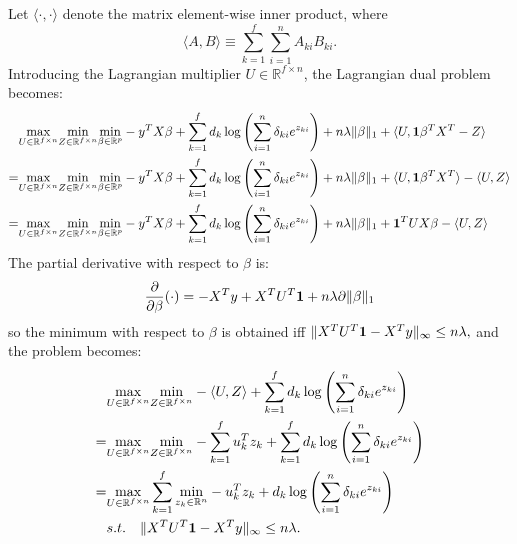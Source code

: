 Let $\langle\cdot,\cdot\rangle$ denote the matrix element-wise inner product, where
\begin{equation}
    \langle A,B \rangle\equiv\sum_{k=1}^f\sum_{i=1}^nA_{ki}B_{ki}.
\end{equation}
Introducing the Lagrangian multiplier $U\in\mathbb{R}^{f\times n}$, the Lagrangian dual problem becomes:
\begin{gather}
    \label{eq:dual+u}
    \begin{aligned}
        &\underset{U\in \mathbb{R}^{f\times n}}{\mathrm{max}}\underset{Z\in \mathbb{R}^{f\times n}}{\mathrm{min}}\underset{\beta\in \mathbb{R}^p}{\mathrm{min}}-y^TX\beta+\sum_{k=1}^f d_k\log\left(\sum_{i=1}^n \delta_{ki} e^{z_{ki}}\right)+n\lambda\lVert\beta\rVert_1+\langle U,\mathbf{1}\beta^TX^T-Z\rangle\\
        =&\underset{U\in \mathbb{R}^{f\times n}}{\mathrm{max}}\underset{Z\in \mathbb{R}^{f\times n}}{\mathrm{min}}\underset{\beta\in \mathbb{R}^p}{\mathrm{min}}-y^TX\beta+\sum_{k=1}^f d_k\log\left(\sum_{i=1}^n \delta_{ki} e^{z_{ki}}\right)+n\lambda\lVert\beta\rVert_1+\langle U,\mathbf{1}\beta^TX^T\rangle-\langle U,Z\rangle\\
        =&\underset{U\in \mathbb{R}^{f\times n}}{\mathrm{max}}\underset{Z\in \mathbb{R}^{f\times n}}{\mathrm{min}}\underset{\beta\in \mathbb{R}^p}{\mathrm{min}}-y^TX\beta+\sum_{k=1}^f d_k\log\left(\sum_{i=1}^n \delta_{ki} e^{z_{ki}}\right)+n\lambda\lVert\beta\rVert_1+\mathbf{1}^TUX\beta-\langle U,Z\rangle
    \end{aligned}    
\end{gather}
The partial derivative with respect to $\beta$ is:
\begin{equation}
    \label{eq:partialbetacox}
    \frac{\partial}{\partial\beta}(\cdot) =-X^Ty+X^TU^T\mathbf{1}+n\lambda\partial\lVert\beta\rVert_1
\end{equation}
so the minimum with respect to $\beta$ is obtained iff $\lVert X^TU^T\mathbf{1}-X^Ty\rVert_\infty\leq n\lambda,$ and the problem becomes:
\begin{gather}
    \label{eq:dual-beta}
    \begin{aligned}
        &\underset{U\in \mathbb{R}^{f\times n}}{\mathrm{max}}\underset{Z\in \mathbb{R}^{f\times n}}{\mathrm{min}}- \langle U,Z\rangle+\sum_{k=1}^f d_k\log\left(\sum_{i=1}^n \delta_{ki} e^{z_{ki}}\right)\\
        =&\underset{U\in \mathbb{R}^{f\times n}}{\mathrm{max}}\underset{Z\in \mathbb{R}^{f\times n}}{\mathrm{min}}-\sum_{k=1}^f u_k^Tz_k +\sum_{k=1}^f d_k\log\left(\sum_{i=1}^n \delta_{ki} e^{z_{ki}}\right)\\
        =&\underset{U\in \mathbb{R}^{f\times n}}{\mathrm{max}}\sum_{k=1}^f\underset{z_k\in \mathbb{R}^n}{\mathrm{min}}-u_k^Tz_k+d_k\log\left(\sum_{i=1}^n \delta_{ki} e^{z_{ki}}\right)\\
        &s.t.\quad \lVert X^TU^T\mathbf{1}-X^Ty\rVert_\infty\leq n\lambda.
    \end{aligned}
\end{gather}
